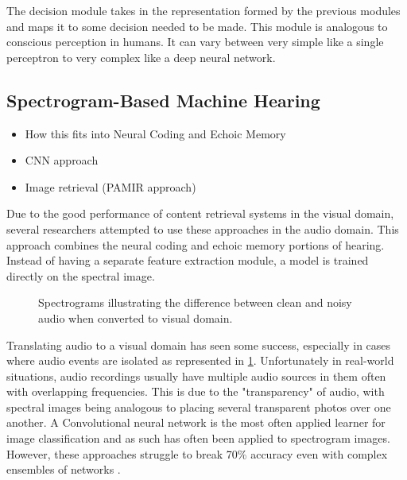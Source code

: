 The decision module takes in the representation formed by the previous modules and maps it to some decision needed to be made. This module is analogous to conscious perception in humans. It can vary between very simple like a single perceptron to very complex like a deep neural network.

\subsection{Spectrogram-Based Machine Hearing}
\begin{itemize}
    \item How this fits into Neural Coding and Echoic Memory
    \item CNN approach
    \item Image retrieval (PAMIR approach)
\end{itemize}

Due to the good performance of content retrieval systems in the visual domain, several researchers attempted to use these approaches in the audio domain. This approach combines the neural coding and echoic memory portions of hearing. Instead of having a separate feature extraction module, a model is trained directly on the spectral image.

\begin{figure}[!tbp]
    \centering
    \hfill
    \caption{Spectrograms illustrating the difference between clean and noisy audio when converted to visual domain.}
    \label{fig:noisy_audio_cmpr}
\end{figure}

Translating audio to a visual domain has seen some success, especially in cases where audio events are isolated as represented in \ref{fig:noisy_audio_cmpr}. Unfortunately in real-world situations, audio recordings usually have multiple audio sources in them often with overlapping frequencies. This is due to the "transparency" of audio, with spectral images being analogous to placing several transparent photos over one another. A Convolutional neural network is the most often applied learner for image classification and as such has often been applied to spectrogram images. However, these approaches struggle to break 70\% accuracy even with complex ensembles of networks \cite{xu_large-scale_2018, piczak_environmental_2015}.

